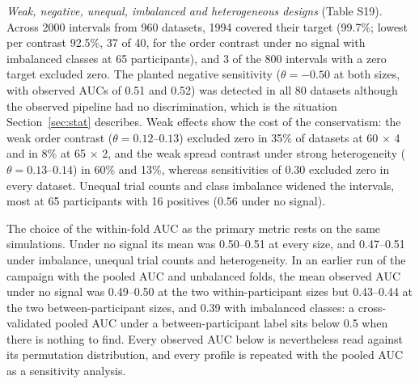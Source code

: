 \emph{Weak, negative, unequal, imbalanced and heterogeneous designs} (Table S19). Across 2000 intervals from 960 datasets, 1994 covered their target (99.7\%; lowest per contrast 92.5\%, 37 of 40, for the order contrast under no signal with imbalanced classes at 65 participants), and 3 of the 800 intervals with a zero target excluded zero. The planted negative sensitivity ($\theta = -0.50$ at both sizes, with observed AUCs of 0.51 and 0.52) was detected in all 80 datasets although the observed pipeline had no discrimination, which is the situation Section~\ref{sec:stat} describes. Weak effects show the cost of the conservatism: the weak order contrast ($\theta = 0.12$--$0.13$) excluded zero in 35\% of datasets at 60 $\times$ 4 and in 8\% at 65 $\times$ 2, and the weak spread contrast under strong heterogeneity ($\theta = 0.13$--$0.14$) in 60\% and 13\%, whereas sensitivities of 0.30 excluded zero in every dataset. Unequal trial counts and class imbalance widened the intervals, most at 65 participants with 16 positives (0.56 under no signal).

The choice of the within-fold AUC as the primary metric rests on the same simulations. Under no signal its mean was 0.50--0.51 at every size, and 0.47--0.51 under imbalance, unequal trial counts and heterogeneity. In an earlier run of the campaign with the pooled AUC and unbalanced folds, the mean observed AUC under no signal was 0.49--0.50 at the two within-participant sizes but 0.43--0.44 at the two between-participant sizes, and 0.39 with imbalanced classes: a cross-validated pooled AUC under a between-participant label sits below 0.5 when there is nothing to find. Every observed AUC below is nevertheless read against its permutation distribution, and every profile is repeated with the pooled AUC as a sensitivity analysis.

\begin{table}[!htbp]
\centering\small
\caption{Calibration of the refit-bootstrap interval at the Monte Carlo settings of the reported profiles ($R = 6$, $B = 60$; within-fold AUC, class-balanced folds). Per design and size (40 datasets each): intervals with target zero by argument, those excluding zero, the pooled rejection rate ($\pm$ SE over datasets), coverage of the target (zero or estimated) over all genuine intervals, and the mean interval width. W: label within participants; B: between participants.}
\label{tab:cal}

\end{table}
